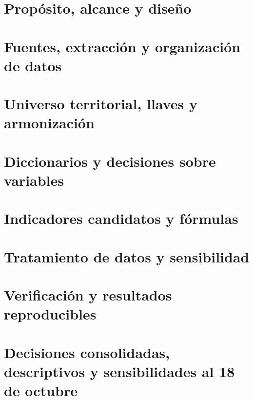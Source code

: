 \section{Propósito, alcance y diseño}
\label{sec:alcance}


\section{Fuentes, extracción y organización de datos}
\label{sec:fuentes_extraccion}


\section{Universo territorial, llaves y armonización}
\label{sec:universo_llaves}


\section{Diccionarios y decisiones sobre variables}
\label{sec:seleccion_variables}



\section{Indicadores candidatos y fórmulas}
\label{sec:indicadores}


\section{Tratamiento de datos y sensibilidad}
\label{sec:tratamientos_sensibilidad}


\section{Verificación y resultados reproducibles}
\label{sec:verificacion_resultados}


\section{Decisiones consolidadas, descriptivos y sensibilidades al 18 de octubre}
\label{sec:actualizacion_descriptiva}


